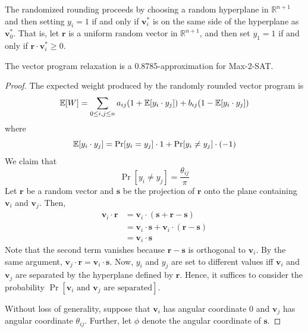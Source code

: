 The randomized rounding proceeds by choosing a random hyperplane in $\mathbb{R}^{n+1}$ and then setting $y_i = 1$ if and only if $\mathbf{v}_i^*$ is on the same side of the hyperplane as $\mathbf{v}_0^*$. That is, let $\mathbf{r}$ is a uniform random vector in $\mathbb{R}^{n+1}$, and then set $y_1 = 1$ if and only if $\mathbf{r} \cdot \mathbf{v}_i^* \geq 0$.

\begin{theorem}
    The vector program relaxation is a 0.8785-approximation for Max-2-SAT.
\end{theorem}

\begin{proof}
    The expected weight produced by the randomly rounded vector program is
    $$
    \mathbb{E}[W] = \sum_{0\leq i,j \leq n} a_{ij} (1 + \mathbb{E}[y_i \cdot y_j]) + b_{ij} (1 - \mathbb{E}[y_i \cdot y_j])
    $$
    where
    $$
    \mathbb{E}[y_i \cdot y_j] = \Pr[y_i = y_j] \cdot 1 + \Pr[y_i \neq y_j] \cdot (-1)
    $$
    We claim that
    $$
    \Pr[y_i \neq y_j] = \frac{\theta_{ij}}{\pi}
    $$
    Let $\mathbf{r}$ be a random vector and $\mathbf{s}$ be the projection of $\mathbf{r}$ onto the plane containing $\mathbf{v}_i$ and $\mathbf{v}_j$. Then,
    $$
    \begin{aligned}
        \mathbf{v}_i \cdot \mathbf{r} &= \mathbf{v}_i \cdot (\mathbf{s} + \mathbf{r} - \mathbf{s}) \\
        &= \mathbf{v}_i \cdot \mathbf{s} + \mathbf{v}_i \cdot (\mathbf{r} - \mathbf{s}) \\
        &= \mathbf{v}_i \cdot \mathbf{s}
    \end{aligned}
    $$
    Note that the second term vanishes because $\mathbf{r}-\mathbf{s}$ is orthogonal to $\mathbf{v}_i$. By the same argument, $\mathbf{v}_j \cdot \mathbf{r} = \mathbf{v}_i \cdot \mathbf{s}$. Now, $y_i$ and $y_j$ are set to different values iff $\mathbf{v}_i$ and $\mathbf{v}_j$ are separated by the hyperplane defined by $\mathbf{r}$. Hence, it suffices to consider the probability $\Pr[\text{$\mathbf{v}_i$ and $\mathbf{v}_j$ are separated}]$.
    
    Without loss of generality, suppose that $\mathbf{v}_i$ has angular coordinate $0$ and $\mathbf{v}_j$ has angular coordinate $\theta_{ij}$. Further, let $\phi$ denote the angular coordinate of $\mathbf{s}$.


\end{proof}
